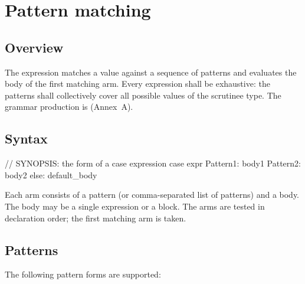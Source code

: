\chapter{Pattern matching}
\label{sec:15-match}

\section{Overview}
\label{sec:match.overview}

\pnum
The  expression matches a value against a sequence of patterns
and evaluates the body of the first matching arm.  Every 
expression shall be exhaustive: the patterns shall collectively cover all
possible values of the scrutinee type.  The grammar production is
 (Annex~A).

\section{Syntax}
\label{sec:match.syntax}

\begin{laincode}
// SYNOPSIS: the form of a case expression
case expr {
    Pattern1: body1
    Pattern2: body2
    else:     default_body
}
\end{laincode}

\pnum
Each arm consists of a pattern (or comma-separated list of patterns) and a
body.  The body may be a single expression or a block.  The arms are
tested in declaration order; the first matching arm is taken.

\section{Patterns}
\label{sec:match.patterns}

\pnum
The following pattern forms are supported:

